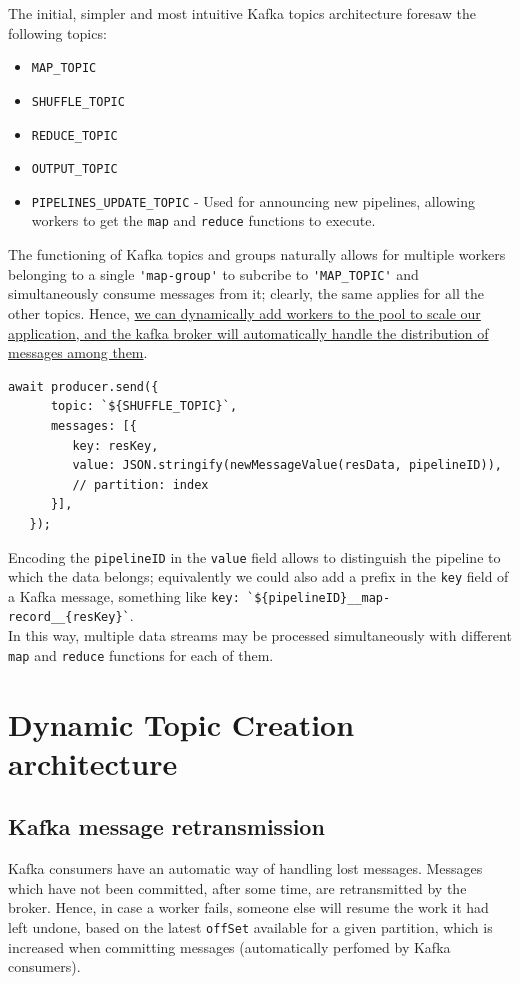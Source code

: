 {The initial, simpler and most intuitive Kafka topics architecture foresaw the following topics:\ns
\begin{itemize}
   \label{enum:simplerTopics}
   \item \lstinline|MAP_TOPIC|
   \item \lstinline|SHUFFLE_TOPIC|
   \item \lstinline|REDUCE_TOPIC|
   \item \lstinline|OUTPUT_TOPIC|
   \item \lstinline|PIPELINES_UPDATE_TOPIC| - Used for announcing new pipelines, allowing workers to get the \lstinline|map| and \lstinline|reduce| functions to execute.
\end{itemize}}

The functioning of Kafka topics and groups naturally allows for multiple workers belonging to a single \lstinline|'map-group'| to subcribe to \lstinline|'MAP_TOPIC'| and simultaneously consume messages from it; clearly, the same applies for all the other topics. 
Hence, \ul{we can dynamically add workers to the pool to scale our application, and the kafka broker will automatically handle the distribution of messages among them}.

\begin{lstlisting}[caption={Sending MAP record to shuffle topic},label={lst:sendingMapRecord}]
   await producer.send({
      topic: `${SHUFFLE_TOPIC}`,
      messages: [{
         key: resKey,
         value: JSON.stringify(newMessageValue(resData, pipelineID)),
         // partition: index 
      }],
   });
\end{lstlisting}
Encoding the \lstinline|pipelineID| in the \lstinline|value| field allows to distinguish the pipeline to which the data belongs; equivalently we could also add a prefix in the \texttt{key} field of a Kafka message, something like \lstinline|key: `${pipelineID}__map-record__{resKey}`|.\\
In this way, multiple data streams may be processed simultaneously with different \lstinline|map| and \lstinline|reduce| functions for each of them.


\section{Dynamic Topic Creation architecture}
\subsection{Kafka message retransmission}
Kafka consumers have an automatic way of handling lost messages. Messages which have not been committed, after some time, are retransmitted by the broker. Hence, in case a worker fails, someone else will resume the work it had left undone, based on the latest \texttt{offSet} available for a given partition, which is increased when committing messages (automatically perfomed by Kafka consumers).

